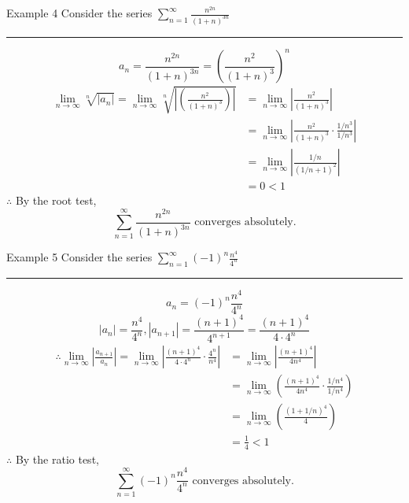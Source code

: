 \documentclass[12pt,a4paper]{article}
\begin{document}
\begin{eg}{Example 4}
	Consider the series $\displaystyle\sum_{n=1}^\infty\frac{n^{2n}}{(1+n)^{3n}}$\\
	\noindent\rule[0.25\baselineskip]{\textwidth}{1pt}
	$$a_n=\frac{n^{2n}}{(1+n)^{3n}}=\left(\frac{n^2}{(1+n)^3}\right)^n$$
	$$\begin{aligned}
		\lim_{n\to\infty}\sqrt[n]{|a_n|}=\lim_{n\to\infty}\sqrt[n]{\left|\left(\frac{n^2}{(1+n)^3}\right)\right|}&=\lim_{n\to\infty}\left|\frac{n^2}{(1+n)^3}\right|\\
		&=\lim_{n\to\infty}\left|\frac{n^2}{(1+n)^3}\cdot\frac{1/n^3}{1/n^3}\right|\\
		&=\lim_{n\to\infty}\left|\frac{1/n}{(1/n+1)^2}\right|\\
		&=0<1
	\end{aligned}$$
	$\therefore$ By the root test, 
	$$\sum_{n=1}^\infty\frac{n^{2n}}{(1+n)^{3n}}\text{ converges absolutely.}$$
\end{eg}
\begin{eg}{Example 5}
	Consider the series $\displaystyle\sum_{n=1}^\infty(-1)^n\frac{n^4}{4^n}$\\
	\noindent\rule[0.25\baselineskip]{\textwidth}{1pt}
	$$a_n=(-1)^n\frac{n^4}{4^n}$$
	$$|a_n|=\frac{n^4}{4^n}, |a_{n+1}|=\frac{(n+1)^4}{4^{n+1}}=\frac{(n+1)^4}{4\cdot4^n}$$
	$$\begin{aligned}
		\therefore\lim_{n\to\infty}\left|\frac{a_{n+1}}{a_n}\right|=\lim_{n\to\infty}\left|\frac{(n+1)^4}{4\cdot4^n}\cdot\frac{4^n}{n^4}\right|&=\lim_{n\to\infty}\left|\frac{(n+1)^4}{4n^4}\right|\\
		&=\lim_{n\to\infty}\left(\frac{(n+1)^4}{4n^4}\cdot\frac{1/n^4}{1/n^4}\right)\\
		&=\lim_{n\to\infty}\left(\frac{(1+1/n)^4}{4}\right)\\
		&=\frac{1}{4}<1
	\end{aligned}$$
	$\therefore$ By the ratio test, 
	$$\sum_{n=1}^\infty(-1)^n\frac{n^4}{4^n}\text{ converges absolutely.}$$
\end{eg}
\end{document}
